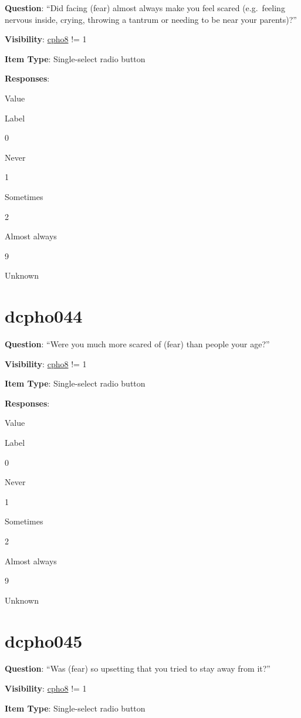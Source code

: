 \documentclass[]{book}
\begin{document}
\textbf{Question}: ``Did facing (fear) almost always make you feel scared (e.g.~feeling nervous inside, crying, throwing a tantrum or needing to be near your parents)?''

\textbf{Visibility}: \protect\hyperlink{cpho8}{cpho8} != 1

\textbf{Item Type}: Single-select radio button

\textbf{Responses}:

Value

Label

0

Never

1

Sometimes

2

Almost always

9

Unknown

\hypertarget{dcpho044}{%
\section{dcpho044}\label{dcpho044}}

\textbf{Question}: ``Were you much more scared of (fear) than people your age?''

\textbf{Visibility}: \protect\hyperlink{cpho8}{cpho8} != 1

\textbf{Item Type}: Single-select radio button

\textbf{Responses}:

Value

Label

0

Never

1

Sometimes

2

Almost always

9

Unknown

\hypertarget{dcpho045}{%
\section{dcpho045}\label{dcpho045}}

\textbf{Question}: ``Was (fear) so upsetting that you tried to stay away from it?''

\textbf{Visibility}: \protect\hyperlink{cpho8}{cpho8} != 1

\textbf{Item Type}: Single-select radio button
\end{document}
